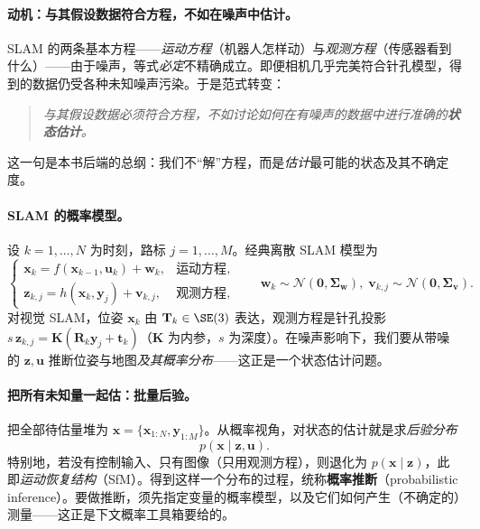 \paragraph{动机：与其假设数据符合方程，不如在噪声中估计。}
SLAM 的两条基本方程——\emph{运动方程}（机器人怎样动）与\emph{观测方程}（传感器看到什么）——由于噪声，等式\emph{必定}不精确成立\cite{gaoxiang2019slam14}。即便相机几乎完美符合针孔模型，得到的数据仍受各种未知噪声污染。于是范式转变：
\begin{quote}
\emph{与其假设数据必须符合方程，不如讨论如何在有噪声的数据中进行准确的\textbf{状态估计}。}
\end{quote}
这一句是本书后端的总纲：我们不“解”方程，而是\emph{估计}最可能的状态及其不确定度。

\paragraph{SLAM 的概率模型。}
设 $k=1,\dots,N$ 为时刻，路标 $j=1,\dots,M$。经典离散 SLAM 模型为\cite{gaoxiang2019slam14}
\begin{equation}
  \begin{cases}
    \mathbf{x}_k=f(\mathbf{x}_{k-1},\mathbf{u}_k)+\mathbf{w}_k, & \text{运动方程},\\
    \mathbf{z}_{k,j}=h(\mathbf{x}_k,\mathbf{y}_j)+\mathbf{v}_{k,j}, & \text{观测方程},
  \end{cases}
  \qquad
  \mathbf{w}_k\sim\mathcal{N}(\mathbf{0},\boldsymbol{\Sigma}_{\mathbf{w}}),\;
  \mathbf{v}_{k,j}\sim\mathcal{N}(\mathbf{0},\boldsymbol{\Sigma}_{\mathbf{v}}).
  \label{eq:slam-model}
\end{equation}
对视觉 SLAM，位姿 $\mathbf{x}_k$ 由 $\mathbf{T}_k\in\SE(3)$ 表达，观测方程是针孔投影 $s\,\mathbf{z}_{k,j}=\mathbf{K}(\mathbf{R}_k\mathbf{y}_j+\mathbf{t}_k)$（$\mathbf{K}$ 为内参，$s$ 为深度）。在噪声影响下，我们要从带噪的 $\mathbf{z},\mathbf{u}$ 推断位姿与地图\emph{及其概率分布}——这正是一个状态估计问题。

\paragraph{把所有未知量一起估：批量后验。}
把全部待估量堆为 $\mathbf{x}=\{\mathbf{x}_{1:N},\mathbf{y}_{1:M}\}$。从概率视角，对状态的估计就是求\emph{后验分布}\cite{gaoxiang2019slam14,carlone2026handbook}
\begin{equation}
  p(\mathbf{x}\mid\mathbf{z},\mathbf{u}).
  \label{eq:posterior}
\end{equation}
特别地，若没有控制输入、只有图像（只用观测方程），则退化为 $p(\mathbf{x}\mid\mathbf{z})$，此即\emph{运动恢复结构}（SfM）。得到这样一个分布的过程，统称\textbf{概率推断}（probabilistic inference）\cite{carlone2026handbook}。要做推断，须先指定变量的概率模型，以及它们如何产生（不确定的）测量——这正是下文概率工具箱要给的。

